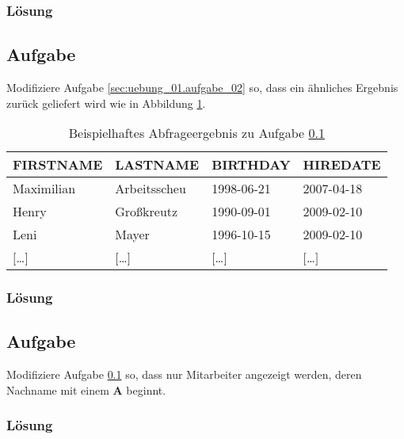 \subsubsection*{Lösung}
\label{sec:uebung_01.aufgabe_02.loesung}

\subsection{Aufgabe}
\label{sec:uebung_01.aufgabe_03}
Modifiziere Aufgabe \ref{sec:uebung_01.aufgabe_02} so, dass ein ähnliches Ergebnis zurück geliefert wird wie in Abbildung \ref{tbl:uebung_01.aufgabe_03}.

\begin{table}[H]
  \ttfamily
  \begin{tabularx}{\textwidth}{X|X|X|X}
    \textbf{FIRSTNAME} & \textbf{LASTNAME} & \textbf{BIRTHDAY} & \textbf{HIREDATE} \\
    \hline\hline
    Maximilian & Arbeitsscheu & 1998-06-21 & 2007-04-18 \\
    Henry & Großkreutz & 1990-09-01 & 2009-02-10 \\
    Leni & Mayer & 1996-10-15 & 2009-02-10 \\
    $[$\dots$]$ & $[$\dots$]$ & $[$\dots$]$ & $[$\dots$]$ \\
  \end{tabularx}
  \caption{Beispielhaftes Abfrageergebnis zu Aufgabe \ref{sec:uebung_01.aufgabe_03}}
  \label{tbl:uebung_01.aufgabe_03}
\end{table}

\subsubsection*{Lösung}
\label{sec:uebung_01.aufgabe_03.loesung}

\subsection{Aufgabe}
\label{sec:uebung_01.aufgabe_04}
Modifiziere Aufgabe \ref{sec:uebung_01.aufgabe_03} so, dass nur Mitarbeiter angezeigt werden, deren Nachname mit einem \textbf{A} beginnt.

\subsubsection*{Lösung}
\label{sec:uebung_01.aufgabe_04.loesung}

